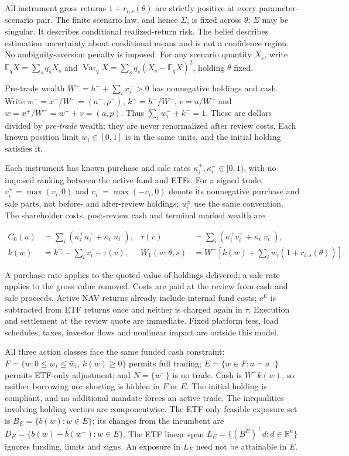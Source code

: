 \documentclass[11pt]{article}
\begin{document}
All instrument gross returns \(1+r_{i,s}(\theta)\) are strictly
positive at every parameter-scenario pair. The finite scenario law,
and hence \(\Sigma\), is fixed across \(\theta\); \(\Sigma\) may be
singular. It describes conditional realized-return risk. The belief
describes estimation uncertainty about conditional means and is not
a confidence region. No ambiguity-aversion penalty is imposed.
For any scenario quantity \(X_s\), write
\(\mathbb E_qX=\sum_s q_sX_s\) and
\(\operatorname{Var}_qX=\sum_s q_s(X_s-\mathbb E_qX)^2\),
holding \(\theta\) fixed.

Pre-trade wealth \(W^-=h^-+\sum_i x_i^->0\) has nonnegative holdings
and cash. Write
\(w^-=x^-/W^-=(a^-,p^-)\), \(k^-=h^-/W^-\),
\(v=u/W^-\) and \(w=x^+/W^-=w^-+v=(a,p)\). Thus
\(\sum_iw_i^-+k^-=1\). These are dollars divided by \emph{pre-trade}
wealth; they are never renormalized after review costs. Each known
position limit \(\bar w_i\in[0,1]\) is in the same units, and the
initial holding satisfies it.

Each instrument has known purchase and sale rates
\(\kappa_i^+,\kappa_i^-\in[0,1)\), with no imposed ranking between
the active fund and ETFs. For a signed trade, \(v_i^+=\max(v_i,0)\)
and \(v_i^-=\max(-v_i,0)\) denote its nonnegative purchase and sale
parts, not before- and after-review holdings; \(u_i^\pm\) use the
same convention. The shareholder costs,
post-review cash and terminal marked wealth are

\begin{equation*}
\begin{aligned}
C_0(u)&=\sum_i(\kappa_i^+u_i^++\kappa_i^-u_i^-),
&\tau(v)&=\sum_i(\kappa_i^+v_i^++\kappa_i^-v_i^-),\\
k(w)&=k^--\sum_i v_i-\tau(v),
&W_1(w;\theta,s)&=W^-\!\left[k(w)+\sum_iw_i(1+r_{i,s}(\theta))\right].
\end{aligned}
\end{equation*}

A purchase rate applies to the quoted value of holdings delivered;
a sale rate applies to the gross value removed. Costs are paid at
the review from cash and sale proceeds. Active NAV returns already
include internal fund costs; \(c^E\) is subtracted from ETF returns
once and neither is charged again in \(\tau\). Execution and
settlement at the review quote are immediate. Fixed platform fees,
load schedules, taxes, investor flows and nonlinear impact are
outside this model.

All three action classes face the same funded cash constraint:
\(F=\{w:0\leq w_i\leq\bar w_i,\ k(w)\geq0\}\) permits full
trading; \(E=\{w\in F:a=a^-\}\) permits ETF-only adjustment; and
\(N=\{w^-\}\) is no trade. Cash is \(W^-k(w)\), so neither borrowing
nor shorting is hidden in \(F\) or \(E\). The initial holding is
compliant, and no additional mandate forces an active trade. The
inequalities involving holding vectors are componentwise. The
ETF-only feasible exposure set is \(B_E=\{b(w):w\in E\}\);
its changes from the incumbent are
\(D_E=\{b(w)-b(w^-):w\in E\}\). The ETF linear span
\(L_E=\{(B^E)^\top d:d\in\mathbb R^n\}\) ignores funding, limits
and signs. An exposure in \(L_E\) need not be attainable in \(E\).
\end{document}
